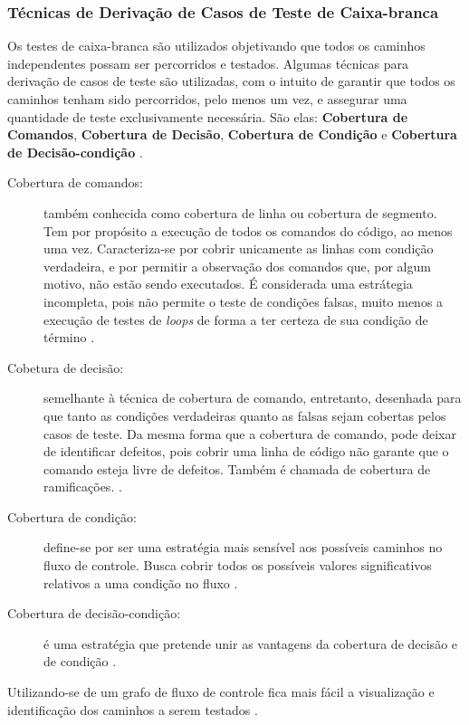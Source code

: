 \subsubsection{Técnicas de Derivação de Casos de Teste de Caixa-branca}
Os testes de caixa-branca são utilizados objetivando que todos os caminhos independentes possam ser percorridos e testados. Algumas técnicas para derivação de casos de teste são utilizadas, com o intuito de garantir que todos os caminhos tenham sido percorridos, pelo menos um vez, e assegurar uma quantidade de teste exclusivamente necessária. São elas: \textbf{Cobertura de Comandos}, \textbf{Cobertura de Decisão}, \textbf{Cobertura de Condição} e \textbf{Cobertura de Decisão-condição} \cite{istqb2014}.

\begin{description}
\item[Cobertura de comandos:] também conhecida como cobertura de linha ou cobertura de segmento. Tem por propósito a execução de todos os comandos do código, ao menos uma vez. Caracteriza-se por cobrir unicamente as linhas com condição verdadeira, e por permitir a observação dos comandos que, por algum motivo, não estão sendo executados. É considerada uma estrátegia incompleta, pois não permite o teste de condições falsas, muito menos a execução de testes de \textit{loops} de forma a ter certeza de sua condição de término \cite{istqb2014}.
\item[Cobetura de decisão:] semelhante à técnica de cobertura de comando, entretanto, desenhada para que tanto as condições verdadeiras quanto as falsas sejam cobertas pelos casos de teste. Da mesma forma que a cobertura de comando, pode deixar de identificar defeitos, pois cobrir uma linha de código não garante que o comando esteja livre de defeitos. Também é chamada de cobertura de ramificações. \cite{istqb2014}.
\item[Cobertura de condição:] define-se por ser uma estratégia mais sensível aos possíveis caminhos no fluxo de controle. Busca cobrir todos os possíveis valores significativos relativos a uma condição no fluxo \cite{istqb2014}.
\item[Cobertura de decisão-condição:] é uma estratégia que pretende unir as vantagens da cobertura de decisão e de condição \cite{istqb2014}.
\end{description}
\par
\indent Utilizando-se de um grafo de fluxo de controle fica mais fácil a visualização e identificação dos caminhos a serem testados \cite{copeland2003}.
\par
